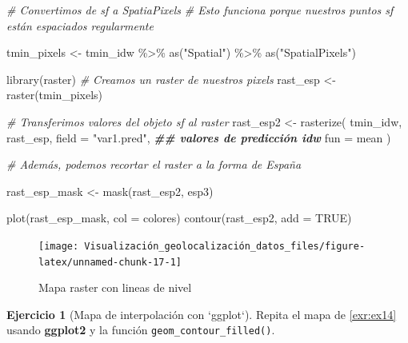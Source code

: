 \documentclass[
]{report}
\newenvironment{Shaded}{\begin{snugshade}}{\end{snugshade}}
\newcommand{\AttributeTok}[1]{\textcolor[rgb]{0.77,0.63,0.00}{#1}}
\newcommand{\CommentTok}[1]{\textcolor[rgb]{0.56,0.35,0.01}{\textit{#1}}}
\newcommand{\ConstantTok}[1]{\textcolor[rgb]{0.00,0.00,0.00}{#1}}
\newcommand{\DocumentationTok}[1]{\textcolor[rgb]{0.56,0.35,0.01}{\textbf{\textit{#1}}}}
\newcommand{\FunctionTok}[1]{\textcolor[rgb]{0.00,0.00,0.00}{#1}}
\newcommand{\NormalTok}[1]{#1}
\newcommand{\OtherTok}[1]{\textcolor[rgb]{0.56,0.35,0.01}{#1}}
\newcommand{\SpecialCharTok}[1]{\textcolor[rgb]{0.00,0.00,0.00}{#1}}
\newcommand{\StringTok}[1]{\textcolor[rgb]{0.31,0.60,0.02}{#1}}
\theoremstyle{definition}
\theoremstyle{definition}
\theoremstyle{definition}
\newtheorem{exercise}{Ejercicio}[chapter]
\theoremstyle{definition}
\theoremstyle{remark}
\begin{document}
\begin{Shaded}
\begin{Highlighting}[]
\CommentTok{\# Convertimos de sf a SpatiaPixels}
\CommentTok{\# Esto funciona porque nuestros puntos sf están espaciados regularmente}

\NormalTok{tmin\_pixels }\OtherTok{\textless{}{-}}\NormalTok{ tmin\_idw }\SpecialCharTok{\%\textgreater{}\%}
  \FunctionTok{as}\NormalTok{(}\StringTok{"Spatial"}\NormalTok{) }\SpecialCharTok{\%\textgreater{}\%}
  \FunctionTok{as}\NormalTok{(}\StringTok{"SpatialPixels"}\NormalTok{)}


\FunctionTok{library}\NormalTok{(raster)}
\CommentTok{\# Creamos un raster de nuestros pixels}
\NormalTok{rast\_esp }\OtherTok{\textless{}{-}} \FunctionTok{raster}\NormalTok{(tmin\_pixels)}

\CommentTok{\# Transferimos valores del objeto sf al raster}
\NormalTok{rast\_esp2 }\OtherTok{\textless{}{-}} \FunctionTok{rasterize}\NormalTok{(}
\NormalTok{  tmin\_idw,}
\NormalTok{  rast\_esp,}
  \AttributeTok{field =} \StringTok{"var1.pred"}\NormalTok{, }\DocumentationTok{\#\# valores de predicción idw}
  \AttributeTok{fun =}\NormalTok{ mean}
\NormalTok{)}

\CommentTok{\# Además, podemos recortar el raster a la forma de España}

\NormalTok{rast\_esp\_mask }\OtherTok{\textless{}{-}} \FunctionTok{mask}\NormalTok{(rast\_esp2, esp3)}

\FunctionTok{plot}\NormalTok{(rast\_esp\_mask, }\AttributeTok{col =}\NormalTok{ colores)}
\FunctionTok{contour}\NormalTok{(rast\_esp2, }\AttributeTok{add =} \ConstantTok{TRUE}\NormalTok{)}
\end{Highlighting}
\end{Shaded}

\begin{figure}

{\centering \texttt{[image: Visualización\_geolocalización\_datos\_files/figure-latex/unnamed-chunk-17-1]} 

}

\caption{Mapa raster con lineas de nivel}\label{fig:unnamed-chunk-17}
\end{figure}

\begin{exercise}[Mapa de interpolación con `ggplot`]
\protect\hypertarget{exr:ex15}{}\label{exr:ex15}Repita el mapa de \ref{exr:ex14} usando \textbf{ggplot2} y la función
\texttt{geom\_contour\_filled()}.
\end{exercise}
\end{document}
